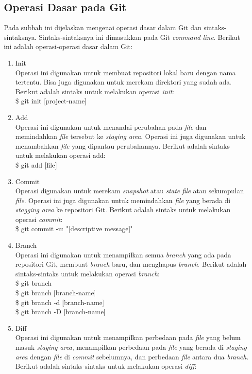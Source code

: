 \subsection{Operasi Dasar pada Git}
\label{subsec:operasi_dasar_git}
Pada subbab ini dijelaskan mengenai operasi dasar dalam Git dan sintaks-sintaksnya. Sintaks-sintaksnya ini dimasukkan pada Git \textit{command line}. Berikut ini adalah operasi-operasi dasar dalam Git:
\begin{enumerate}
\item Init\\
Operasi ini digunakan untuk membuat repositori lokal baru dengan nama tertentu. Bisa juga digunakan untuk merekam direktori yang sudah ada. Berikut adalah sintaks untuk melakukan operasi  \textit{init}:\\
\$ git init [project-name]
\item Add\\
Operasi ini digunakan untuk menandai perubahan pada \textit{file} dan memindahkan \textit{file} tersebut ke \textit{staging area}. Operasi ini juga digunakan untuk menambahkan \textit{file} yang dipantau perubahannya. Berikut adalah sintaks untuk melakukan operasi add:\\
\$ git add [file]
\item Commit\\
Operasi digunakan untuk merekam \textit{snapshot} atau \textit{state} \textit{file} atau sekumpulan \textit{file}. Operasi ini juga digunakan untuk memindahkan \textit{file} yang berada di \textit{stagging area} ke repositori Git. Berikut adalah sintaks untuk melakukan operasi \textit{commit}:\\
\$ git commit -m "[descriptive message]"
\item Branch\\
Operasi ini digunakan untuk menampilkan semua \textit{branch} yang ada pada repositori Git, membuat \textit{branch} baru, dan menghapus \textit{branch}. Berikut adalah sintaks-sintaks untuk melakukan operasi \textit{branch}:\\
\$ git branch\\
\$ git branch [branch-name]\\
\$ git branch -d [branch-name]\\
\$ git branch -D [branch-name]
\item Diff\\
Operasi ini digunakan untuk menampilkan perbedaan pada \textit{file} yang belum masuk \textit{staging area}, menampilkan perbedaan pada \textit{file} yang berada di \textit{staging area} dengan \textit{file} di \textit{commit} sebelumnya, dan perbedaan \textit{file} antara dua \textit{branch}.  Berikut adalah sintaks-sintaks untuk melakukan operasi \textit{diff}:\\

\end{enumerate}
